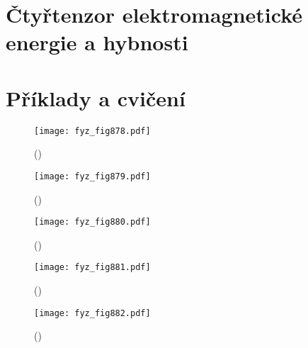   \section{Čtyřtenzor elektromagnetické energie a hybnosti}\label{fyz:IIchapXXXIsecVIII}
  \section{Příklady a cvičení}\label{fyz:IIchapXXXIsecIX}









    \begin{figure}[ht!] %
      \centering
      \texttt{[image: fyz\_fig878.pdf]}
      \caption{
               (\cite[s.~707]{Feynman02})}
      \label{fyz:fig878}
    \end{figure}

    \begin{figure}[ht!] %
      \centering
      \texttt{[image: fyz\_fig879.pdf]}
      \caption{
               (\cite[s.~707]{Feynman02})}
      \label{fyz:fig879}
    \end{figure}

    \begin{figure}[ht!] %
      \centering
      \texttt{[image: fyz\_fig880.pdf]}
      \caption{
               (\cite[s.~707]{Feynman02})}
      \label{fyz:fig880}
    \end{figure}

    \begin{figure}[ht!] %
      \centering
      \texttt{[image: fyz\_fig881.pdf]}
      \caption{
               (\cite[s.~707]{Feynman02})}
      \label{fyz:fig881}
    \end{figure}

    \begin{figure}[ht!] %
      \centering
      \texttt{[image: fyz\_fig882.pdf]}
      \caption{
               (\cite[s.~707]{Feynman02})}
      \label{fyz:fig882}
    \end{figure}


